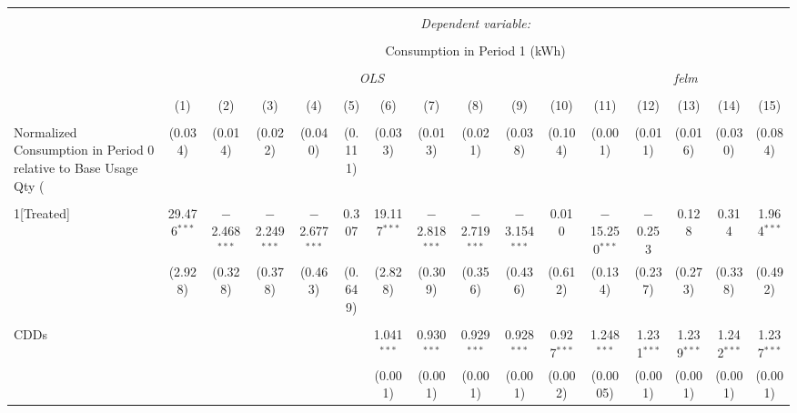 
\begin{table}[!htbp] \centering 
  \caption{} 
  \label{} 
\small 
\begin{tabular}{@{\extracolsep{5pt}}lccccccccccccccc} 
\\[-1.8ex]\hline 
\hline \\[-1.8ex] 
 & \multicolumn{15}{c}{\textit{Dependent variable:}} \\ 
\cline{2-16} 
\\[-1.8ex] & \multicolumn{15}{c}{Consumption in Period 1 (kWh)} \\ 
\\[-1.8ex] & \multicolumn{10}{c}{\textit{OLS}} & \multicolumn{5}{c}{\textit{felm}} \\ 
\\[-1.8ex] & (1) & (2) & (3) & (4) & (5) & (6) & (7) & (8) & (9) & (10) & (11) & (12) & (13) & (14) & (15)\\ 
\hline \\[-1.8ex] 
 Normalized Consumption in Period 0 relative to Base Usage Qty (%
  & (0.034) & (0.014) & (0.022) & (0.040) & (0.111) & (0.033) & (0.013) & (0.021) & (0.038) & (0.104) & (0.001) & (0.011) & (0.016) & (0.030) & (0.084) \\ 
  & & & & & & & & & & & & & & & \\ 
 1[Treated] & 29.476$^{***}$ & $-$2.468$^{***}$ & $-$2.249$^{***}$ & $-$2.677$^{***}$ & 0.307 & 19.117$^{***}$ & $-$2.818$^{***}$ & $-$2.719$^{***}$ & $-$3.154$^{***}$ & 0.010 & $-$15.250$^{***}$ & $-$0.253 & 0.128 & 0.314 & 1.964$^{***}$ \\ 
  & (2.928) & (0.328) & (0.378) & (0.463) & (0.649) & (2.828) & (0.309) & (0.356) & (0.436) & (0.612) & (0.134) & (0.237) & (0.273) & (0.338) & (0.492) \\ 
  & & & & & & & & & & & & & & & \\ 
 CDDs &  &  &  &  &  & 1.041$^{***}$ & 0.930$^{***}$ & 0.929$^{***}$ & 0.928$^{***}$ & 0.927$^{***}$ & 1.248$^{***}$ & 1.231$^{***}$ & 1.239$^{***}$ & 1.242$^{***}$ & 1.237$^{***}$ \\ 
  &  &  &  &  &  & (0.001) & (0.001) & (0.001) & (0.001) & (0.002) & (0.0005) & (0.001) & (0.001) & (0.001) & (0.001) \\ 

\end{tabular}
\end{table}
